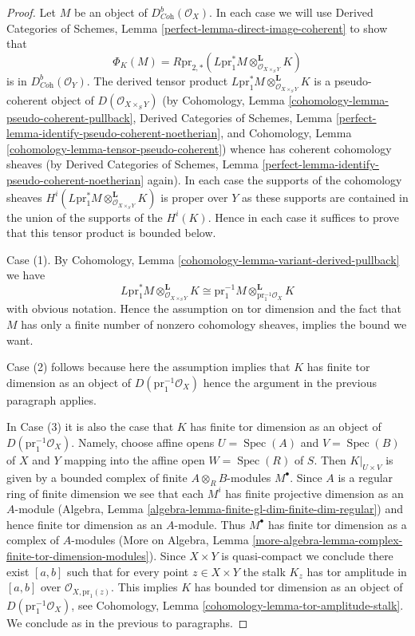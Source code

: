 \documentclass{stacks-project}
\theoremstyle{plain}
\theoremstyle{definition}
\theoremstyle{remark}
\numberwithin{equation}{subsection}
\def\Spec{\mathop{\mathrm{Spec}}}
\begin{document}
\begin{proof}
Let $M$ be an object of $D^b_{\textit{Coh}}(\mathcal{O}_X)$.
In each case we will use Derived Categories of Schemes, Lemma
\ref{perfect-lemma-direct-image-coherent} to show that
$$
\Phi_K(M) = R\text{pr}_{2, *}(
L\text{pr}_1^*M
\otimes_{\mathcal{O}_{X \times_S Y}}^\mathbf{L}
K)
$$
is in $D^b_{\textit{Coh}}(\mathcal{O}_Y)$. The derived tensor product
$L\text{pr}_1^*M \otimes_{\mathcal{O}_{X \times_S Y}}^\mathbf{L} K$
is a pseudo-coherent object of $D(\mathcal{O}_{X \times_S Y})$
(by
Cohomology, Lemma \ref{cohomology-lemma-pseudo-coherent-pullback},
Derived Categories of Schemes, Lemma
\ref{perfect-lemma-identify-pseudo-coherent-noetherian}, and
Cohomology, Lemma \ref{cohomology-lemma-tensor-pseudo-coherent})
whence has coherent cohomology sheaves (by
Derived Categories of Schemes, Lemma
\ref{perfect-lemma-identify-pseudo-coherent-noetherian} again).
In each case the supports of the cohomology sheaves
$H^i(L\text{pr}_1^*M \otimes_{\mathcal{O}_{X \times_S Y}}^\mathbf{L} K)$
is proper over $Y$ as these supports are contained in the
union of the supports of the $H^i(K)$. Hence in each case
it suffices to prove that this tensor product is bounded below.

\medskip\noindent
Case (1). By Cohomology, Lemma \ref{cohomology-lemma-variant-derived-pullback}
we have
$$
L\text{pr}_1^*M
\otimes_{\mathcal{O}_{X \times_S Y}}^\mathbf{L}
K
\cong
\text{pr}_1^{-1}M
\otimes_{\text{pr}_1^{-1}\mathcal{O}_X}^\mathbf{L}
K
$$
with obvious notation. Hence the assumption on tor dimension
and the fact that $M$ has only a finite number of nonzero
cohomology sheaves, implies the bound we want.

\medskip\noindent
Case (2) follows because here the assumption implies that $K$ has
finite tor dimension as an object of $D(\text{pr}_1^{-1}\mathcal{O}_X)$
hence the argument in the previous paragraph applies.

\medskip\noindent
In Case (3) it is also the case that $K$ has finite tor dimension
as an object of $D(\text{pr}_1^{-1}\mathcal{O}_X)$. Namely, choose
affine opens $U = \Spec(A)$ and $V = \Spec(B)$ of $X$ and $Y$ mapping into the
affine open $W = \Spec(R)$ of $S$. Then
$K|_{U \times V}$ is given by a bounded complex of finite
$A \otimes_R B$-modules $M^\bullet$. Since $A$ is a regular ring
of finite dimension we see that each $M^i$ has finite projective dimension
as an $A$-module (Algebra, Lemma
\ref{algebra-lemma-finite-gl-dim-finite-dim-regular})
and hence finite tor dimension as an $A$-module.
Thus $M^\bullet$ has finite tor dimension as a complex of $A$-modules
(More on Algebra, Lemma
\ref{more-algebra-lemma-complex-finite-tor-dimension-modules}).
Since $X \times Y$ is quasi-compact we conclude there exist $[a, b]$
such that for every point $z \in X \times Y$ the stalk $K_z$
has tor amplitude in $[a, b]$ over $\mathcal{O}_{X, \text{pr}_1(z)}$.
This implies $K$ has bounded tor dimension as an object of
$D(\text{pr}_1^{-1}\mathcal{O}_X)$, see
Cohomology, Lemma \ref{cohomology-lemma-tor-amplitude-stalk}.
We conclude as in the previous to paragraphs.


\end{proof}
\end{document}
